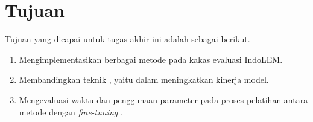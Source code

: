 \section{Tujuan}
\label{sec:tujuan}

Tujuan yang  dicapai untuk tugas akhir ini adalah sebagai berikut.

\begin{enumerate}
    \item Mengimplementasikan berbagai metode \PEFT pada kakas evaluasi IndoLEM.
    \item Membandingkan teknik \PEFT, yaitu \methodPEFT dalam meningkatkan kinerja model.
    \item Mengevaluasi waktu dan penggunaan parameter pada proses pelatihan antara metode \PEFT dengan \textit{fine-tuning} .
\end{enumerate}
